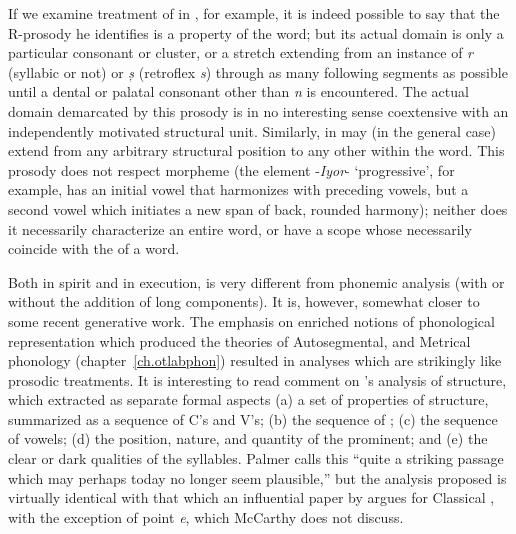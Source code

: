 If we examine  treatment of 
in , for example, it is indeed possible to say that the
R-prosody he identifies is a property of the word; but its actual
domain is only a particular consonant or cluster, or a stretch
extending from an instance of \emph{r} (syllabic or not) or \emph{ș}
(retroflex \emph{s}) through as many following segments as possible
until a dental or palatal consonant other than \emph{n} is
encountered. The actual domain demarcated by this prosody is in no
interesting sense coextensive with an independently motivated
structural unit. Similarly,  in  may (in the
general case) extend from any arbitrary structural position to any
other within the word. This prosody does not respect morpheme
 (the element -\emph{Iyor}- `progressive', for example, has an
initial vowel that harmonizes with preceding vowels, but a second
vowel which initiates a new span of back, rounded harmony); neither
does it necessarily characterize an entire word, or have a scope whose
 necessarily coincide with the  of a word.

Both in spirit and in execution,  is very different
from phonemic analysis (with or without the addition of long
components). It is, however, somewhat closer to some recent generative
work. The emphasis on enriched notions of phonological representation
which produced the theories of Autosegmental, and Metrical phonology
(chapter~\ref{ch.otlabphon}) resulted in analyses which are strikingly
like prosodic treatments. It is interesting to read
 comment on {\Firth}'s analysis of 
structure, which extracted as separate formal aspects (a) a set of
properties of  structure, summarized as a sequence of C's and
V's; (b) the sequence of ; (c) the sequence of vowels; (d)
the position, nature, and quantity of the prominent; and (e) the clear
or dark qualities of the syllables. Palmer calls this ``quite a
striking passage which may perhaps today no longer seem plausible,''
but the analysis proposed is virtually identical with that which an
influential paper by \citet{mccarthy81:prosodictheory} argues for
Classical , with the exception of point \emph{e}, which McCarthy
does not discuss.

